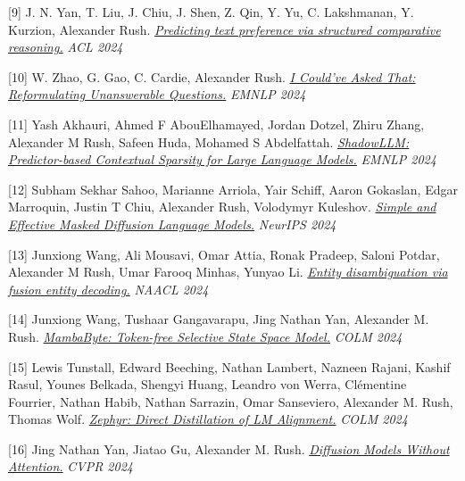 \documentclass[10pt]{article}
\begin{document}
\medskip


[9] \ind J. N. Yan, T. Liu, J. Chiu, J. Shen, Z. Qin, Y. Yu, C. Lakshmanan, Y. Kurzion, Alexander Rush. \emph{\href{ https://aclanthology.org/2024.acl-long.839/ }{ Predicting text preference via structured comparative reasoning.} }\emph{ ACL 2024 }

\medskip


[10] \ind W. Zhao, G. Gao, C. Cardie, Alexander Rush. \emph{\href{ https://arxiv.org/abs/2407.17469 }{ I Could've Asked That: Reformulating Unanswerable Questions.} }\emph{ EMNLP 2024 }

\medskip


[11] \ind Yash Akhauri, Ahmed F AbouElhamayed, Jordan Dotzel, Zhiru Zhang, Alexander M Rush, Safeen Huda, Mohamed S Abdelfattah. \emph{\href{ https://arxiv.org/abs/2406.16635 }{ ShadowLLM: Predictor-based Contextual Sparsity for Large Language Models.} }\emph{ EMNLP 2024 }

\medskip


[12] \ind Subham Sekhar Sahoo, Marianne Arriola, Yair Schiff, Aaron Gokaslan, Edgar Marroquin, Justin T Chiu, Alexander Rush, Volodymyr Kuleshov. \emph{\href{ https://arxiv.org/abs/2406.07524 }{ Simple and Effective Masked Diffusion Language Models.} }\emph{ NeurIPS 2024 }

\medskip


[13] \ind Junxiong Wang, Ali Mousavi, Omar Attia, Ronak Pradeep, Saloni Potdar, Alexander M Rush, Umar Farooq Minhas, Yunyao Li. \emph{\href{ https://arxiv.org/abs/2404.01626 }{ Entity disambiguation via fusion entity decoding.} }\emph{ NAACL 2024 }

\medskip


[14] \ind Junxiong Wang, Tushaar Gangavarapu, Jing Nathan Yan, Alexander M. Rush. \emph{\href{ https://arxiv.org/abs/2401.13660 }{ MambaByte: Token-free Selective State Space Model.} }\emph{ COLM 2024 }

\medskip


[15] \ind Lewis Tunstall, Edward Beeching, Nathan Lambert, Nazneen Rajani, Kashif Rasul, Younes Belkada, Shengyi Huang, Leandro von Werra, Clémentine Fourrier, Nathan Habib, Nathan Sarrazin, Omar Sanseviero, Alexander M. Rush, Thomas Wolf. \emph{\href{ https://arxiv.org/pdf/2310.16944.pdf }{ Zephyr: Direct Distillation of LM Alignment.} }\emph{ COLM 2024 }

\medskip


[16] \ind Jing Nathan Yan, Jiatao Gu, Alexander M. Rush. \emph{\href{ https://arxiv.org/abs/2311.18257 }{ Diffusion Models Without Attention.} }\emph{ CVPR 2024 }
\end{document}
